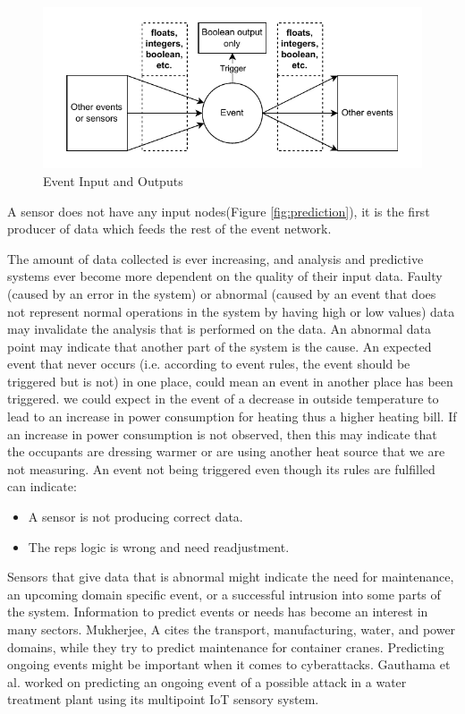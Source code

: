 \documentclass[a4paper,8pt]{article}
\begin{document}
		\begin{figure}[!h]
			\centering
			\includegraphics[width=.8\textwidth]{EventTrigger}
			\caption{Event Input and Outputs}
			\label{fig:eventInAOut}
		\end{figure}
		
		A sensor does not have any input nodes(Figure \ref{fig:prediction}), it is the first producer of data which feeds the rest of the event network.		
		
		The amount of data collected is ever increasing, and analysis and predictive systems ever become more dependent on the quality of their input data. Faulty (caused by an error in the system) or abnormal (caused by an event that does not represent normal operations in the system by having high or low values) data may invalidate the analysis that is performed on the data. An abnormal data point may indicate that another part of the system is the cause.
		An expected event that never occurs (i.e. according to event rules, the event should be triggered but is not) in one place, could mean an event in another place has been triggered. we could expect in the event of a decrease in outside temperature to lead to an increase in power consumption for heating thus a higher heating bill. If an increase in power consumption is not observed, then this may indicate that the occupants are dressing warmer or are using another heat source that we are not measuring. An event not being triggered even though its rules are fulfilled can indicate:
		\begin{itemize}
			\item A sensor is not producing correct data.
			\item The \gls{reps} logic is wrong and need readjustment.
		\end{itemize}
		
		Sensors that give data that is abnormal might indicate the need for maintenance\cite{MUKHERJEE2024102444}, an upcoming domain specific event, or a successful intrusion into some parts of the system\cite{MR2022103046}. Information to predict events or needs has become an interest in many sectors. Mukherjee, A\cite{MUKHERJEE2024102444} cites the transport, manufacturing, water, and power domains, while they try to predict maintenance for container cranes. Predicting ongoing events might be important when it comes to cyberattacks. Gauthama et al. worked on predicting an ongoing event of a possible attack in a water treatment plant using its multipoint IoT sensory system\cite{MR2022103046}.
		
\end{document}
